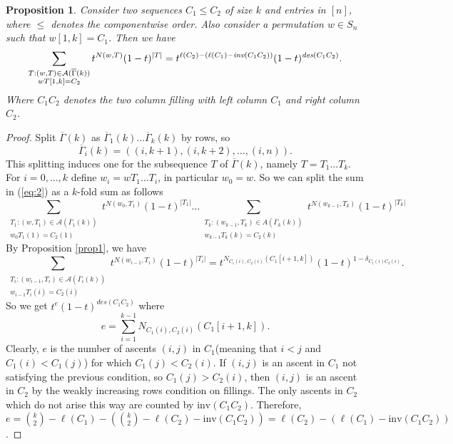 \documentclass[11pt]{amsart}
\newtheorem{prop}{Proposition}[section]
\begin{document}
{\begin{prop}\label{prop2} Consider two sequences $C_{1} \leq C_{2}$ of size $k$ and entries in $[n]$, where $\leq$ denotes the componentwise order. Also consider a permutation $w\in S_{n}$ such that $w[1,k]=C_{1}$. Then we have 
\begin{equation}\label{eq:2}
\sum_{\substack{T:(w,T)\in \mathcal{A}(\overline{\Gamma}(k)) \\ wT[1,k]=C_{2}}} t^{N(w,T)}(1-t)^{|T|}=t^{\ell(C_{2})-(\ell(C_{1})-\emph{inv}(C_{1}C_{2}))}(1-t)^{\emph{des}(C_{1}C_{2})}.
\end{equation}
Where $C_{1}C_{2}$ denotes the two column filling with left column $C_{1}$ and right column $C_{2}$.
\end{prop}
\begin{proof}
Split $\overline{\Gamma}(k)$ as $\overline{\Gamma}_{1}(k)\ldots \overline{\Gamma}_{k}(k)$ by rows, so$$\overline{\Gamma}_{i}(k)=((i,k+1), (i,k+2), \ldots, (i,n)).$$ This splitting induces one for the subsequence $T$ of $\overline{\Gamma}(k)$, namely $T=T_{1}\ldots T_{k}$. For $i=0,\ldots, k$ define $w_{i}=wT_{1}\ldots T_{i}$, in particular $w_{0}=w$. So we can split the sum in (\ref{eq:2}) as a $k$-fold sum as follows
\begin{equation*}
\sum_{\substack{T_{1}:(w,T_{1})\in \mathcal{A}(\overline{\Gamma}_{1}(k)) \\ w_{0}T_{1}(1)=C_{2}(1)}}t^{N(w_{0},T_{1})}(1-t)^{|T_{1}|}\ldots \sum_{\substack{T_{k}:(w_{k-1},T_{k})\in A(\overline{\Gamma}_{k}(k)) \\ w_{k-1}T_{k}(k)=C_{2}(k)}}t^{N(w_{k-1},T_{k})}(1-t)^{|T_{k}|}
\end{equation*}
By Proposition \ref{prop1}, we have 
\begin{equation*}
\sum_{\substack{T_{i}:(w_{i-1},T_{i})\in \mathcal{A}(\overline{\Gamma}_{i}(k)) \\ w_{i-1}T_{i}(i)=C_{2}(i)}}t^{N(w_{i-1},T_{i})}(1-t)^{|T_{i}|}=t^{N_{C_{1}(i),C_{2}(i)}(C_{1}[i+1,k])}(1-t)^{1- \delta_{C_{1}(i)C_{2}(i)}}.
\end{equation*}
So we get $t^{e}(1-t)^{des(C_{1}C_{2})}$ where $$e=\sum_{i=1}^{k-1}N_{C_{1}(i),C_{2}(i)}(C_{1}[i+1,k]).$$
Clearly, $e$ is the number of ascents $(i,j)$ in $C_{1}$(meaning that $i<j$ and $C_{1}(i)<C_{1}(j)$) for which $C_{1}(j)<C_{2}(i)$. If $(i,j)$ is an ascent in $C_{1}$ not satisfying the previous condition, so $C_{1}(j)> C_{2}(i)$, then $(i,j)$ is an ascent in $C_{2}$ by the weakly increasing rows condition on fillings. The only ascents in $C_{2}$ which do not arise this way are counted by $\textrm{inv}(C_{1}C_{2})$. Therefore, $e=\binom{k}{2}-\ell(C_{1})-(\binom{k}{2}-\ell(C_{2})-\textrm{inv}(C_{1}C_{2}))=\ell(C_{2})-(\ell(C_{1})-\textrm{inv}(C_{1}C_{2}))$.
\end{proof}


}
\end{document}
